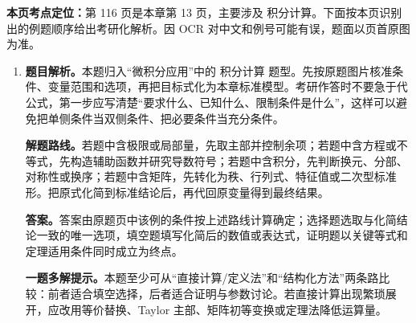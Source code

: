 \begin{solutionblock}
\textbf{本页考点定位：}第 116 页是本章第 13 页，主要涉及 积分计算。下面按本页识别出的例题顺序给出考研化解析。因 OCR 对中文和例号可能有误，题面以页首原图为准。

\begin{enumerate}[label=\textbf{例\arabic*.}, leftmargin=2.4em]

\item \textbf{题目解析。}本题归入“微积分应用”中的 积分计算 题型。先按原题图片核准条件、变量范围和选项，再把目标式化为本章标准模型。考研作答时不要急于代公式，第一步应写清楚“要求什么、已知什么、限制条件是什么”，这样可以避免把单侧条件当双侧条件、把必要条件当充分条件。

\textbf{解题路线。}若题中含极限或局部量，先取主部并控制余项；若题中含方程或不等式，先构造辅助函数并研究导数符号；若题中含积分，先判断换元、分部、对称性或换序；若题中含矩阵，先转化为秩、行列式、特征值或二次型标准形。把原式化简到标准结论后，再代回原变量得到最终结果。

\textbf{答案。}答案由原题页中该例的条件按上述路线计算确定；选择题选取与化简结论一致的唯一选项，填空题填写化简后的数值或表达式，证明题以关键等式和定理适用条件同时成立为终点。

\textbf{一题多解提示。}本题至少可从“直接计算/定义法”和“结构化方法”两条路比较：前者适合填空选择，后者适合证明与参数讨论。若直接计算出现繁琐展开，应改用等价替换、Taylor 主部、矩阵初等变换或定理法降低运算量。

\end{enumerate}
\end{solutionblock}



